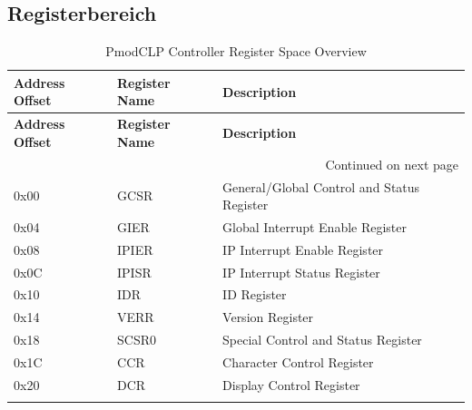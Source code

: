 \subsection{Registerbereich}
\begin{longtable}{|p{3cm}|p{3cm}|p{8cm}|}
    \hline
    \textbf{Address Offset} & \textbf{Register Name} & \textbf{Description} \\
    \hline
    \endfirsthead
    \hline
    \textbf{Address Offset} & \textbf{Register Name} & \textbf{Description} \\
    \hline
    \endhead
    \hline \multicolumn{3}{|r|}{{Continued on next page}} \\ \hline
    \endfoot
    \hline
    \endlastfoot

    0x00 & GCSR & General/Global Control and Status Register \\
    \hline
    0x04 & GIER & Global Interrupt Enable Register \\
    \hline
    0x08 & IPIER & IP Interrupt Enable Register \\
    \hline
    0x0C & IPISR & IP Interrupt Status Register \\
    \hline
    0x10 & IDR & ID Register \\
    \hline
    0x14 & VERR & Version Register \\
    \hline
    0x18 & SCSR0 & Special Control and Status Register \\
    \hline
    0x1C & CCR & Character Control Register \\
    \hline
    0x20 & DCR & Display Control Register \\
    \hline
    \caption{PmodCLP Controller Register Space Overview}
    \label{tab:register_overview}
    \end{longtable}

